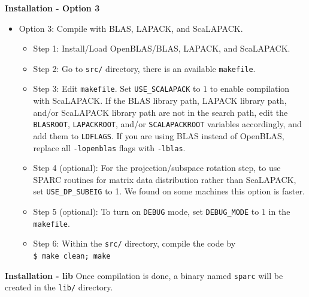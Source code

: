   
  \begin{frame}{\textbf{Installation - Option 3}} \label{Installation:3}
  \begin{itemize}
  \item Option 3: Compile with BLAS, LAPACK, and ScaLAPACK.
    \begin{itemize}
      \item Step 1: Install/Load OpenBLAS/BLAS, LAPACK, and ScaLAPACK.
      \item Step 2: Go to \texttt{src/} directory, there is an available \texttt{makefile}.
      \item Step 3: Edit \texttt{makefile}. Set \texttt{USE\_SCALAPACK} to $1$ to enable compilation with ScaLAPACK. If the BLAS library path, LAPACK library path, and/or ScaLAPACK library path are not in the search path, edit the \texttt{BLASROOT}, \texttt{LAPACKROOT}, and/or \texttt{SCALAPACKROOT} variables accordingly, and add them to \texttt{LDFLAGS}. If you are using BLAS instead of OpenBLAS, replace all \texttt{-lopenblas} flags with \texttt{-lblas}.
      \item Step 4 (optional): For the projection/subspace rotation step, to use SPARC routines for matrix data distribution rather than ScaLAPACK, set \texttt{USE\_DP\_SUBEIG} to 1. We found on some machines this option is faster.		
      \item Step 5 (optional): To turn on \texttt{DEBUG} mode, set \texttt{DEBUG\_MODE} to $1$ in the \texttt{makefile}.
      \item Step 6: Within the \texttt{src/} directory, compile the code by \\
            \texttt{\$ make clean; make}
    \end{itemize}
  \end{itemize}
  
  \end{frame}
  
  \begin{frame}{\textbf{Installation - lib}} \label{Installation:lib}
  Once compilation is done, a binary named \texttt{sparc} will be created in the \texttt{lib/} directory.
  \end{frame}

